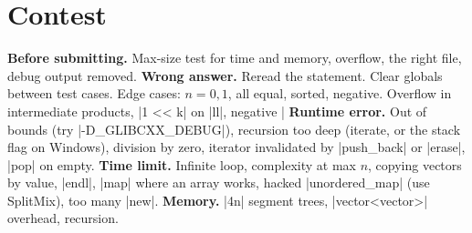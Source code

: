 \section{Contest}





{\small
\textbf{Before submitting.} Max-size test for time and memory, overflow, the right file, debug output removed.
\textbf{Wrong answer.} Reread the statement. Clear globals between test cases. Edge cases: $n = 0, 1$, all equal, sorted, negative. Overflow in intermediate products, \code|1 << k| on \code|ll|, negative \code|%
\textbf{Runtime error.} Out of bounds (try \code|-D_GLIBCXX_DEBUG|), recursion too deep (iterate, or the stack flag on Windows), division by zero, iterator invalidated by \code|push_back| or \code|erase|, \code|pop| on empty.
\textbf{Time limit.} Infinite loop, complexity at max $n$, copying vectors by value, \code|endl|, \code|map| where an array works, hacked \code|unordered_map| (use SplitMix), too many \code|new|.
\textbf{Memory.} \code|4n| segment trees, \code|vector<vector>| overhead, recursion.
\par}
